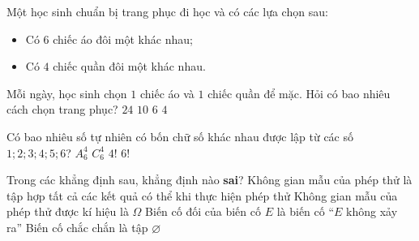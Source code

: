 \begin{ex}%
Một học sinh chuẩn bị trang phục đi học và có các lựa chọn sau:
\begin{itemize}
    \item Có $6$ chiếc áo đôi một khác nhau;
    \item Có $4$ chiếc quần đôi một khác nhau.
\end{itemize}
Mỗi ngày, học sinh chọn $1$ chiếc áo và $1$ chiếc quần để mặc. Hỏi có bao nhiêu cách chọn trang phục?
\choice
{\True $24$}
{$10$}
{$6$}
{$4$}
\end{ex}

\begin{ex}%
    Có bao nhiêu số tự nhiên có bốn chữ số khác nhau được lập từ các số $1;2;3;4;5;6$?
    \choice
    {\True $A_6^4$}
    {$C_6^4$}
    {$4!$}
    {$6!$}
\end{ex}

\begin{ex}%
    Trong các khẳng định sau, khẳng định nào \textbf{sai}?
    \choice
    {Không gian mẫu của phép thử là tập hợp tất cả các kết quả có thể khi thực hiện phép thử}
    {Không gian mẫu của phép thử được kí hiệu là $\Omega$}
    {Biến cố đối của biến cố $E$ là biến cố ``$E$ không xảy ra''}
    {\True Biến cố chắc chắn là tập $\varnothing$}
\end{ex}

